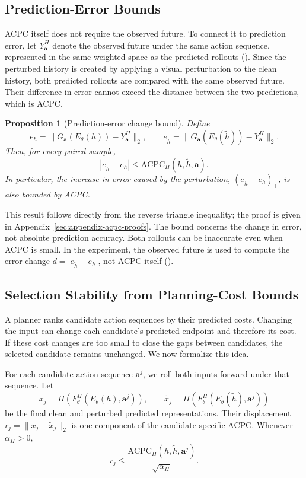 \documentclass[10pt]{article}
\newtheorem{proposition}{Proposition}
\begin{document}
\subsection{Prediction-Error Bounds}

ACPC itself does not require the observed future. To connect it to prediction
error, let $Y_{\mathbf a}^H$ denote the observed future under the same action
sequence, represented in the same weighted space as the predicted rollouts
(). Since the perturbed history is created by
applying a visual perturbation to the clean history, both predicted rollouts
are compared with the same observed future. Their difference in error cannot
exceed the distance between the two predictions, which is ACPC.

\begin{proposition}[Prediction-error change bound]\label{prop:target-free-error-drift}
Define
\[
e_h=\|\bar G_{\mathbf a}(E_\theta(h))-Y_{\mathbf a}^H\|_2,
\qquad
e_{\tilde h}=\|\bar G_{\mathbf a}(E_\theta(\tilde h))-Y_{\mathbf a}^H\|_2.
\]
Then, for every paired sample,
\begin{equation}
|e_{\tilde h}-e_h|
\le \mathrm{ACPC}_H(h,\tilde h,\mathbf a).
\label{eq:target-free-error-drift}
\end{equation}
In particular, the increase in error caused by the perturbation,
$(e_{\tilde h}-e_h)_+$, is also bounded by ACPC.
\end{proposition}
This result follows directly from the reverse triangle inequality; the proof
is given in Appendix~\ref{sec:appendix-acpc-proofs}. The bound concerns the
change in error, not absolute prediction accuracy. Both rollouts can be
inaccurate even when ACPC is small. In the experiment, the observed future is
used to compute the error change $d=|e_{\tilde h}-e_h|$, not ACPC itself
().

\subsection{Selection Stability from Planning-Cost Bounds}

A planner ranks candidate action sequences by their predicted costs. Changing
the input can change each candidate's predicted endpoint and therefore its
cost. If these cost changes are too small to close the gaps between
candidates, the selected candidate remains unchanged. We now formalize this
idea.

For each candidate action sequence $\mathbf a^j$, we roll both inputs forward
under that sequence. Let
\[
x_j=\Pi(F_\theta^H(E_\theta(h),\mathbf a^j)),
\qquad
\tilde x_j=\Pi(F_\theta^H(E_\theta(\tilde h),\mathbf a^j))
\]
be the final clean and perturbed predicted representations. Their displacement
$r_j=\|x_j-\tilde x_j\|_2$ is one component of the candidate-specific ACPC.
Whenever $\alpha_H>0$,
\[
r_j\leq
\frac{\mathrm{ACPC}_H(h,\tilde h,\mathbf a^j)}{\sqrt{\alpha_H}}.
\]
\end{document}
